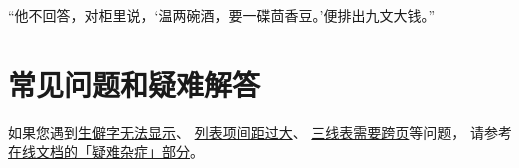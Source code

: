 “他不回答，对柜里说，‘温两碗酒，要一碟茴香豆。’便排出九文大钱。”



\section{常见问题和疑难解答}

如果您遇到\href{https://bithesis.bitnp.net/faq/char-missing.html}{生僻字无法显示}、
\href{https://bithesis.bitnp.net/faq/enumitem-nosep.html}{列表项间距过大}、
\href{https://bithesis.bitnp.net/faq/longtable.html}{三线表需要跨页}等问题，
请参考\textcolor{magenta}{\href{https://bithesis.bitnp.net/faq/}{在线文档的「疑难杂症」部分}}。
